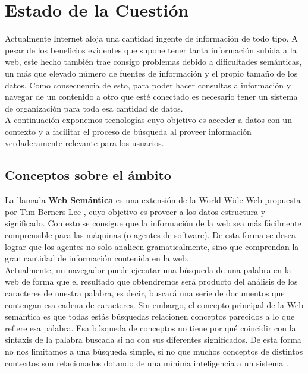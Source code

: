\chapter{Estado de la Cuestión}
\label{cap:estadoDeLaCuestion}

Actualmente Internet aloja una cantidad ingente de información de todo tipo. A pesar de los beneficios evidentes que supone tener tanta información subida a la web, este hecho también trae consigo problemas debido a dificultades semánticas, un más que elevado número de fuentes de información y el propio tamaño de los datos. Como consecuencia de esto, para poder hacer consultas a información y navegar de un contenido a otro que esté conectado es necesario tener un sistema de organización para toda esa cantidad de datos.\\

A continuación exponemos tecnologías cuyo objetivo es acceder a datos con un contexto y a facilitar el proceso de búsqueda al proveer información verdaderamente relevante para los usuarios.\\

\section{Conceptos sobre el ámbito}

La llamada \textbf{Web Semántica} es una extensión de la World Wide Web propuesta por Tim Berners-Lee \cite{berners2001}, cuyo objetivo es proveer a los datos estructura y significado. Con esto se consigue que la información de la web sea más fácilmente comprensible para las máquinas (o agentes de software). De esta forma se desea lograr que los agentes no solo analicen gramaticalmente, sino que comprendan la gran cantidad de información contenida en la web.\\

Actualmente, un navegador puede ejecutar una búsqueda de una palabra en la web de forma que el resultado que obtendremos será producto del análisis de los caracteres de nuestra palabra, es decir, buscará una serie de documentos que contengan esa cadena de caracteres. Sin embargo, el concepto principal de la Web semántica es que todas estás búsquedas relacionen conceptos parecidos a lo que refiere esa palabra. Esa búsqueda de conceptos no tiene por qué coincidir con la sintaxis de la palabra buscada si no con sus diferentes significados. De esta forma no nos limitamos a una búsqueda simple, si no que muchos conceptos de distintos contextos son relacionados dotando de una mínima inteligencia a un sistema \cite{codina2006}.\\

